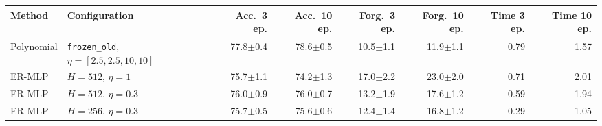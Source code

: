 \begin{tabular}{@{}llrrrrrr@{}}
\toprule
Method & Configuration & Acc.\ 3 ep. & Acc.\ 10 ep. & Forg.\ 3 ep. & Forg.\ 10 ep. & Time 3 ep. & Time 10 ep. \\
\midrule
Polynomial & \texttt{frozen\_old}, $\eta=[2.5, 2.5, 10, 10]$ & 77.8{\scriptsize$\pm$0.4} & 78.6{\scriptsize$\pm$0.5} & 10.5{\scriptsize$\pm$1.1} & 11.9{\scriptsize$\pm$1.1} & 0.79 & 1.57 \\
ER-MLP & $H=512$, $\eta=1$ & 75.7{\scriptsize$\pm$1.1} & 74.2{\scriptsize$\pm$1.3} & 17.0{\scriptsize$\pm$2.2} & 23.0{\scriptsize$\pm$2.0} & 0.71 & 2.01 \\
ER-MLP & $H=512$, $\eta=0.3$ & 76.0{\scriptsize$\pm$0.9} & 76.0{\scriptsize$\pm$0.7} & 13.2{\scriptsize$\pm$1.9} & 17.6{\scriptsize$\pm$1.2} & 0.59 & 1.94 \\
ER-MLP & $H=256$, $\eta=0.3$ & 75.7{\scriptsize$\pm$0.5} & 75.6{\scriptsize$\pm$0.6} & 12.4{\scriptsize$\pm$1.4} & 16.8{\scriptsize$\pm$1.2} & 0.29 & 1.05 \\
\bottomrule
\end{tabular}
